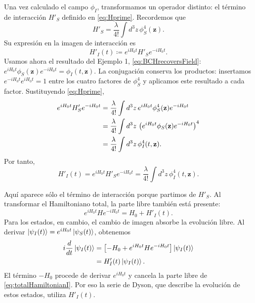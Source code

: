 \documentclass[11pt,letterpaper]{article}
\theoremstyle{definition}
\theoremstyle{definition}
\newcommand{\eqbox}[1]{\boxed{\displaystyle #1}}
\begin{document}
Una vez calculado el campo $\phi_I$, transformamos un operador distinto:
el término de interacción $H'_S$ definido en \eqref{eq:Hprime}. Recordemos que
\begin{equation}
  H'_S=\frac{\lambda}{4!}\int d^3z\,\phi_S^4(\mathbf{z}).
\end{equation}
Su expresión en la imagen de interacción es
\begin{equation}
  \eqbox{H'_I(t)\coloneqq e^{iH_0t}H'_Se^{-iH_0t}.}
  \label{eq:HIdefinition}
\end{equation}
Usamos ahora el resultado del Ejemplo 1, \eqref{eq:BCHrecoversField}:
$e^{iH_0t}\phi_S(\mathbf{z})e^{-iH_0t}=\phi_I(t,\mathbf{z})$.
La conjugación conserva los productos: insertamos
$e^{-iH_0t}e^{iH_0t}=1$ entre los cuatro factores de $\phi_S^4$ y aplicamos
este resultado a cada factor. Sustituyendo \eqref{eq:Hprime},
\begin{align}
  e^{iH_0t}H'_Se^{-iH_0t}
  &=\frac{\lambda}{4!}\int d^3z\,
    e^{iH_0t}\phi_S^4(\mathbf{z})e^{-iH_0t}
    \notag\\
  &=\frac{\lambda}{4!}\int d^3z\,
    \left(e^{iH_0t}\phi_S(\mathbf{z})e^{-iH_0t}\right)^4
    \notag\\
  &=\frac{\lambda}{4!}\int d^3z\,\phi_I^4(t,\mathbf{z}).
  \label{eq:HSaHI}
\end{align}
Por tanto,
\begin{equation}
  \eqbox{H'_I(t)
  =e^{iH_0t}H'_Se^{-iH_0t}
  =\frac{\lambda}{4!}\int d^3z\,\phi_I^4(t,\mathbf{z}).}
  \label{eq:HIphi4}
\end{equation}

Aquí aparece sólo el término de interacción porque partimos de $H'_S$.
Al transformar el Hamiltoniano total, la parte libre también está presente:
\begin{equation}
  e^{iH_0t}He^{-iH_0t}=H_0+H'_I(t).
  \label{eq:totalHamiltonianI}
\end{equation}
Para los estados, en cambio, el cambio de imagen absorbe la evolución libre.
Al derivar $\ket{\psi_I(t)}=e^{iH_0t}\ket{\psi_S(t)}$, obtenemos
\begin{align}
  i\frac{d}{dt}\ket{\psi_I(t)}
  &=\left[-H_0+e^{iH_0t}He^{-iH_0t}\right]\ket{\psi_I(t)}
  \notag\\
  &=H'_I(t)\ket{\psi_I(t)}.
  \label{eq:interactionGenerator}
\end{align}
El término $-H_0$ procede de derivar $e^{iH_0t}$ y cancela la parte libre de
\eqref{eq:totalHamiltonianI}. Por eso la serie de Dyson, que describe la
evolución de estos estados, utiliza $H'_I(t)$.
\end{document}
